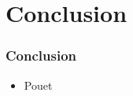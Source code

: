 \section{Conclusion}
  \begin{frame}
    \frametitle{Conclusion}
    \begin{itemize}
      \item Pouet
    \end{itemize}
  \end{frame}

